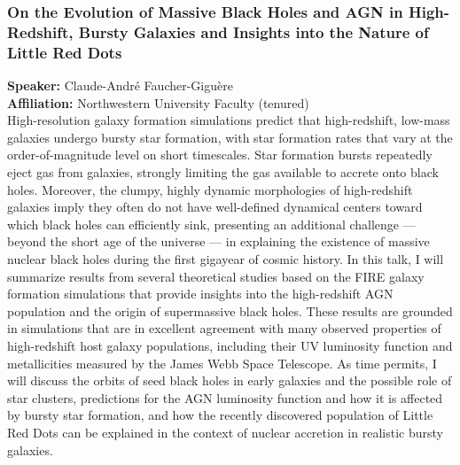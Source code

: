 \subsubsection*{On the Evolution of Massive Black Holes and AGN in High-Redshift, Bursty Galaxies and Insights into the Nature of Little Red Dots}
\textbf{Speaker:} Claude-André Faucher-Giguère \\
\textbf{Affiliation:} Northwestern University \textperiodcentered{} Faculty (tenured)\\
High-resolution galaxy formation simulations predict that high-redshift, low-mass galaxies undergo bursty star formation, with star formation rates that vary at the order-of-magnitude level on short timescales. Star formation bursts repeatedly eject gas from galaxies, strongly limiting the gas available to accrete onto black holes. Moreover, the clumpy, highly dynamic morphologies of high-redshift galaxies imply they often do not have well-defined dynamical centers toward which black holes can efficiently sink, presenting an additional challenge — beyond the short age of the universe — in explaining the existence of massive nuclear black holes during the first gigayear of cosmic history. In this talk, I will summarize results from several theoretical studies based on the FIRE galaxy formation simulations that provide insights into the high-redshift AGN population and the origin of supermassive black holes. These results are grounded in simulations that are in excellent agreement with many observed properties of high-redshift host galaxy populations, including their UV luminosity function and metallicities measured by the James Webb Space Telescope. As time permits, I will discuss the orbits of seed black holes in early galaxies and the possible role of star clusters, predictions for the AGN luminosity function and how it is affected by bursty star formation, and how the recently discovered population of Little Red Dots can be explained in the context of nuclear accretion in realistic bursty galaxies.

\hypertarget{abs-58}{}
